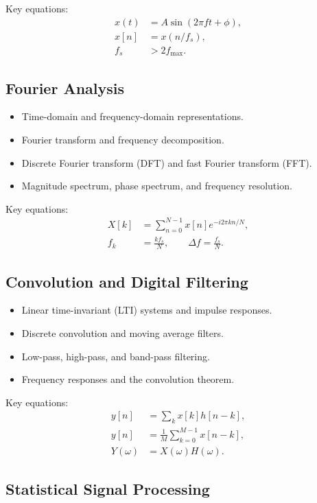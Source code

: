 \documentclass[12pt,fontset=none]{ctexart}
\begin{document}
Key equations:
\begin{align*}
x(t) &= A\sin(2\pi ft+\phi),\\
x[n] &= x(n/f_s),\\
f_s &> 2f_{\max}.
\end{align*}

\subsection{Fourier Analysis}

\begin{itemize}
  \item Time-domain and frequency-domain representations.
  \item Fourier transform and frequency decomposition.
  \item Discrete Fourier transform (DFT) and fast
  Fourier transform (FFT).
  \item Magnitude spectrum, phase spectrum,
  and frequency resolution.
\end{itemize}

Key equations:
\begin{align*}
X[k] &= \sum_{n=0}^{N-1}
x[n]e^{-i2\pi kn/N},\\
f_k &= \frac{kf_s}{N},\qquad
\Delta f = \frac{f_s}{N}.
\end{align*}

\subsection{Convolution and Digital Filtering}

\begin{itemize}
  \item Linear time-invariant (LTI) systems
  and impulse responses.
  \item Discrete convolution and moving average filters.
  \item Low-pass, high-pass, and band-pass filtering.
  \item Frequency responses and the convolution theorem.
\end{itemize}

Key equations:
\begin{align*}
y[n] &= \sum_k x[k]h[n-k],\\
y[n] &= \frac{1}{M}
\sum_{k=0}^{M-1}x[n-k],\\
Y(\omega) &= X(\omega)H(\omega).
\end{align*}

\subsection{Statistical Signal Processing}
\end{document}
